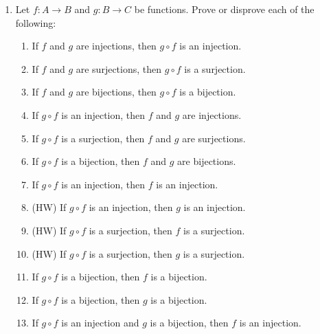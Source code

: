 \documentclass[12pt, reqno]{amsart}
\begin{document}
\begin{enumerate}
\newpage
\item   Let $f\colon A \to B$ and $g \colon B \to C$ be functions. Prove or
  disprove each of the following:
  \begin{enumerate}
  \item If $f$ and $g$ are injections, then $g \circ f$ is an injection.
  \item If $f$ and $g$ are surjections, then $g \circ f$ is a surjection.
  \item If $f$ and $g$ are bijections, then $g \circ f$ is a bijection.
  \item If $g \circ f$ is an injection, then $f$ and $g$ are injections.
  \item If $g \circ f$ is a surjection, then $f$ and $g$ are surjections.
  \item If $g \circ f$ is a bijection, then $f$ and $g$ are bijections.
  \item If $g \circ f$ is an injection, then $f$ is an injection.
  \item (HW) If $g \circ f$ is an injection, then $g$ is an injection.
  \item (HW) If $g \circ f$ is a surjection, then $f$ is a surjection.
  \item (HW) If $g \circ f$ is a surjection, then $g$ is a surjection.
  \item If $g \circ f$ is a bijection, then $f$ is a bijection.
  \item If $g \circ f$ is a bijection, then $g$ is a bijection.
  \item If $g \circ f$ is an injection and $g$ is a bijection, then $f$ is an
    injection.
  \end{enumerate}

\vspace{1in}


\end{enumerate}
\end{document}
